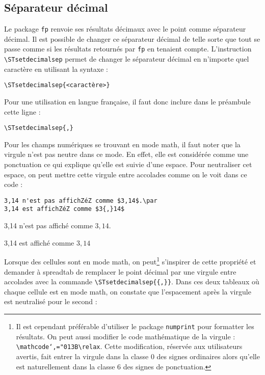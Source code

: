 \documentclass[a4paper,10pt]{article}
\newcommand\verbinline[1][]{\lstinline[breaklines=false,basicstyle=\normalsize\ttfamily,#1]}
\newcommand\ST{\textsf{spreadtab}\xspace}
\begin{document}
\subsection{Séparateur décimal}
Le package \verb-fp- renvoie ses résultats décimaux avec le point comme séparateur décimal. Il est possible de changer ce séparateur décimal de telle sorte que tout se passe comme si les résultats retournés par \verb-fp- en tenaient compte. L'instruction \verbinline-\STsetdecimalsep- permet de changer le séparateur décimal en n'importe quel caractère en utilisant la syntaxe :
\begin{center}
\verbinline-\STsetdecimalsep-\verb-{<caractère>}-
\end{center}
Pour une utilisation en langue française, il faut donc inclure dans le préambule cette ligne :
\begin{center}
\verbinline-\STsetdecimalsep{,}-
\end{center}
Pour les champs numériques se trouvant en mode math, il faut noter que la virgule n'est pas neutre dans ce mode. En effet, elle est considérée comme une ponctuation ce qui explique qu'elle est suivie d'une espace. Pour neutraliser cet espace, on peut mettre cette virgule entre accolades comme on le voit dans ce code :

\begin{minipage}{0.65\linewidth}
\begin{lstlisting}[escapechar=Z,backgroundcolor=\color{ST@codebckgcolor}]
3,14 n'est pas affichZéZ comme $3,14$.\par
3,14 est affichZéZ comme $3{,}14$
\end{lstlisting}
\end{minipage}\hfill
\begin{minipage}{0.35\linewidth}
3,14 n'est pas affiché comme $3,14$.\par
3,14 est affiché comme $3{,}14$
\end{minipage}%

Lorsque des cellules sont en mode math, on peut\footnote{Il est cependant préférable d'utiliser le package \texttt{numprint} pour formatter les résultats. On peut aussi modifier le code mathématique de la virgule : \texttt{\textbackslash mathcode`,="013B\textbackslash relax}. Cette modification, réservée aux utilisateurs avertis, fait entrer la virgule dans la classe 0 des signes ordinaires alors qu'elle est naturellement dans la classe 6 des signes de ponctuation.} s'inspirer de cette propriété et demander à \ST de remplacer le point décimal par une virgule entre accolades avec la commande \verbinline-\STsetdecimalsep{{,}}-. Dans ces deux tableaux où chaque cellule est en mode math, on constate que l'espacement après la virgule est neutralisé pour le second :
\end{document}
